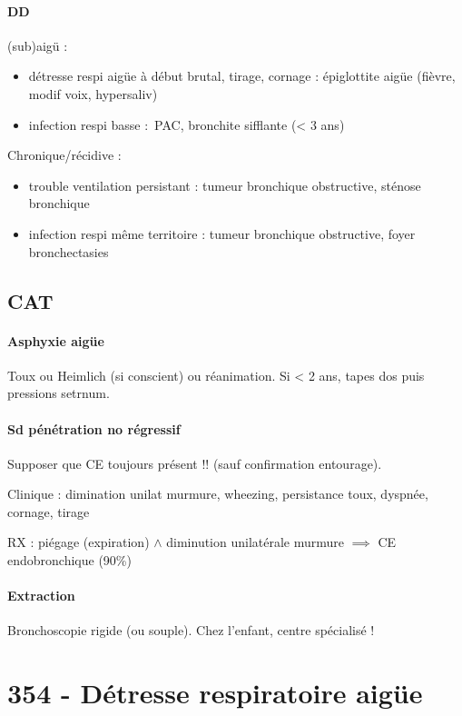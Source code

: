 \paragraph{DD}
(sub)aigü : 
\begin{itemize}
\item détresse respi aigüe à début brutal, tirage, cornage : épiglottite aigüe
  (fièvre, modif voix, hypersaliv)
\item infection respi basse : PAC, bronchite sifflante (< 3 ans)
\end{itemize}
Chronique/récidive :
\begin{itemize}
\item trouble ventilation persistant : tumeur bronchique obstructive, sténose
  bronchique
\item infection respi même territoire : tumeur bronchique obstructive, foyer
  bronchectasies
\end{itemize}

\subsection{CAT}
\paragraph{Asphyxie aigüe}
Toux ou Heimlich (si conscient) ou réanimation. Si < 2 ans, tapes dos puis
pressions setrnum.
\paragraph{Sd pénétration no régressif}
Supposer que CE toujours présent !! (sauf confirmation entourage). 

Clinique : dimination unilat murmure, wheezing, persistance {toux, dyspnée,
  cornage, tirage}

RX  : piégage (expiration) $\wedge$ diminution unilatérale murmure $\implies$ CE
endobronchique (90\%)

\paragraph{Extraction}
Bronchoscopie rigide (ou souple). Chez l'enfant, centre spécialisé !

\section{354 - Détresse respiratoire aigüe}%
\label{sec:354_detresse_respiratoire_aigue}

